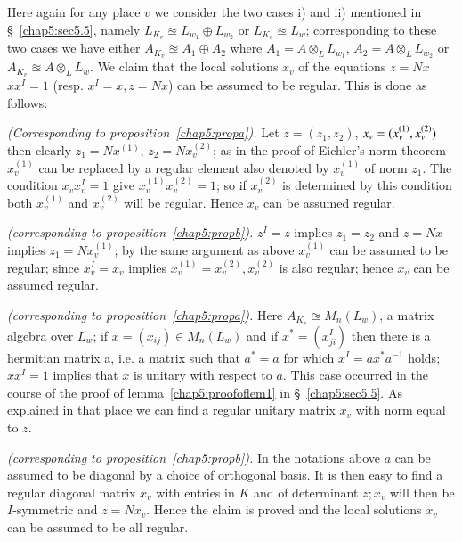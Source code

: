\setcounter{step}{0}
\begin{step}[Construction of $B$]
Here again for any place $v$ we
consider the two cases i) and ii) mentioned in \S~\ref{chap5:sec5.5}, namely
$L_{K_v} \approxeq L_{w_1}\oplus L_{w_2}$ or $L_{K_v}\approxeq L_w$;
corresponding to these two cases we have either $A_{K_v}\approxeq A_1
\oplus A_2$ where $A_1=A \otimes_L L_{w_1}$, $A_2 = A \otimes_L
L_{w_2}$ or $A_{K_v}\approxeq A
\otimes_L L_w$. We claim that the local solutions $x_v$ of the
equations $z=Nx$ $xx^I=1$ (resp. $x^I=x, z=Nx$) can be assumed to be
regular. This is done as follows: 
\end{step}

\begin{romancase}%
{\em (Corresponding to proposition~\ref{chap5:propa}).} Let $z=(z_1,z_2)$,
  $x_v=(x_v^{(1)},\break x_v^{(2)})$ then clearly
  $z_1=Nx^{(1)}$, $z_2=Nx_v^{(2)}$; as in the proof of Eichler's norm
  theorem $x_v^{(1)}$ can be replaced by a regular\pageoriginale
  element also 
  denoted by $x_v^{(1)}$ of norm $z_1$. The condition $x_vx_v^I=1$
  give $x_v^{(1)} x_v^{(2)}=1$; so if $x_v^{(2)}$ is determined by
  this condition both $x_v^{(1)}$ and $x_v^{(2)}$  will be
  regular. Hence $x_v$ can be assumed regular. 
\end{romancase}

\setcounter{romancase}{0}
\begin{romancase}%
{\em (corresponding to proposition~\ref{chap5:propb}).} $z^I=z$ implies $z_1=z_2$ and
  $z=Nx$ implies $z_1=Nx_v^{(1)}$; by the same argument as above
  $x_v^{(1)}$ can be assumed to be regular; since $x_v^I=x_v$ implies
  $x_v^{(1)}=x_v^{(2)},x_v^{(2)}$ is also regular; hence $x_v$ can be
  assumed regular. 
\end{romancase}

\begin{romancase}%
{\em (corresponding to proposition~\ref{chap5:propa}).} Here
  $A_{K_v}\approxeq M_n(L_w)$, a 
  matrix algebra over $L_w$; if $x=(x_{ij})\in M_n(L_w)$ and if
  $x^*=(x_{ji}^I)$ then there is a hermitian matrix a, i.e. a matrix
  such that $a^*=a$ for which $x^I=ax^* a^{-1}$ holds; $xx^I=1$
  implies that $x$ is unitary with respect to $a$. This case occurred
  in the course of the proof of lemma~\ref{chap5:proofoflem1} in 
  \S~\ref{chap5:sec5.5}. As explained in 
  that place we can find a regular unitary matrix $x_v$ with norm
  equal to $z$. 
\end{romancase}

\setcounter{romancase}{1}
\begin{romancase}%
{\em (corresponding to proposition~\ref{chap5:propb}).} In the notations above $a$ can be
  assumed to be diagonal by a choice of orthogonal basis. It is then
  easy to find a regular diagonal matrix $x_v$ with entries in $K$ and
  of determinant $z;x_v$ will then be $I$-symmetric and
  $z=Nx_v$. Hence the claim is proved and the local solutions $x_v$
  can be assumed to be all regular. 
\end{romancase}

